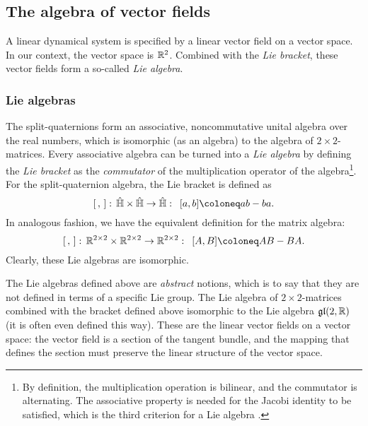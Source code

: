 \subsection{The algebra of vector fields}
\label{ssec:vf_algebra}
A linear dynamical system is specified by a linear vector field on a vector space. In our context, the vector space is $\mathbb{R}^2$. Combined with the \emph{Lie bracket}, these vector fields form a so-called \emph{Lie algebra}.

\subsubsection{Lie algebras}
The split-quaternions form an associative, noncommutative unital algebra over the real numbers, which is isomorphic (as an algebra) to the algebra of $2\times 2$-matrices. Every associative algebra can be turned into a \emph{Lie algebra} by defining the \emph{Lie bracket} as the \emph{commutator} of the multiplication operator of the algebra\footnote{By definition, the multiplication operation is bilinear, and the commutator is alternating. The associative property is needed for the Jacobi identity to be satisfied, which is the third criterion for a Lie algebra \cite{bourbaki1975}.}. For the split-quaternion algebra, the Lie bracket is defined as
\begin{equation}
    \liebr{\,}{}:\, \spquaternions \times \spquaternions \to \spquaternions: \;\: [a, b] \coloneq ab - ba.
\end{equation}
In analogous fashion, we have the equivalent definition for the matrix algebra:
\begin{equation}
    \liebr{\,}{}:\, \real^{2\times 2} \times \real^{2\times 2} \to \real^{2\times 2}: \;\: [A, B] \coloneq AB - BA.
\end{equation}
Clearly, these Lie algebras are isomorphic.

The Lie algebras defined above are \emph{abstract} notions, which is to say that they are not defined in terms of a specific Lie group. The Lie algebra of $2\times 2$-matrices combined with the bracket defined above isomorphic to the Lie algebra $\mathfrak{gl}(2, \mathbb{R})$ (it is often even defined this way). These are the linear vector fields on a vector space: the vector field is a section of the tangent bundle, and the mapping that defines the section must preserve the linear structure of the vector space. 

